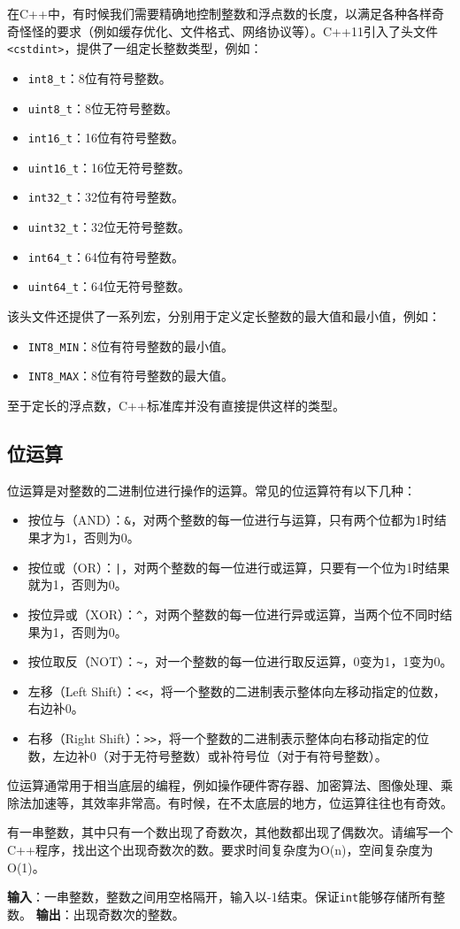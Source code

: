 \documentclass[../main.tex]{subfiles}
\begin{document}
在C++中，有时候我们需要精确地控制整数和浮点数的长度，以满足各种各样奇奇怪怪的要求（例如缓存优化、文件格式、网络协议等）。C++11引入了头文件\texttt{<cstdint>}，提供了一组定长整数类型，例如：
\begin{itemize}
  \item \texttt{int8\_t}：8位有符号整数。
  \item \texttt{uint8\_t}：8位无符号整数。
  \item \texttt{int16\_t}：16位有符号整数。
  \item \texttt{uint16\_t}：16位无符号整数。
  \item \texttt{int32\_t}：32位有符号整数。
  \item \texttt{uint32\_t}：32位无符号整数。
  \item \texttt{int64\_t}：64位有符号整数。
  \item \texttt{uint64\_t}：64位无符号整数。
\end{itemize}
该头文件还提供了一系列宏，分别用于定义定长整数的最大值和最小值，例如：
\begin{itemize}
  \item \texttt{INT8\_MIN}：8位有符号整数的最小值。
  \item \texttt{INT8\_MAX}：8位有符号整数的最大值。
\end{itemize}

至于定长的浮点数，C++标准库并没有直接提供这样的类型。

\subsection{位运算}

位运算是对整数的二进制位进行操作的运算。常见的位运算符有以下几种：
\begin{itemize}
    \item 按位与（AND）：\texttt{\&}，对两个整数的每一位进行与运算，只有两个位都为1时结果才为1，否则为0。
    \item 按位或（OR）：\texttt{|}，对两个整数的每一位进行或运算，只要有一个位为1时结果就为1，否则为0。
    \item 按位异或（XOR）：\texttt{\^}，对两个整数的每一位进行异或运算，当两个位不同时结果为1，否则为0。
    \item 按位取反（NOT）：\texttt{\~}，对一个整数的每一位进行取反运算，0变为1，1变为0。
    \item 左移（Left Shift）：\texttt{<<}，将一个整数的二进制表示整体向左移动指定的位数，右边补0。
    \item 右移（Right Shift）：\texttt{>>}，将一个整数的二进制表示整体向右移动指定的位数，左边补0（对于无符号整数）或补符号位（对于有符号整数）。
\end{itemize}
位运算通常用于相当底层的编程，例如操作硬件寄存器、加密算法、图像处理、乘除法加速等，其效率非常高。有时候，在不太底层的地方，位运算往往也有奇效。
\begin{example}
    有一串整数，其中只有一个数出现了奇数次，其他数都出现了偶数次。请编写一个C++程序，找出这个出现奇数次的数。要求时间复杂度为O(n)，空间复杂度为O(1)。

    \textbf{输入}：一串整数，整数之间用空格隔开，输入以-1结束。保证\texttt{int}能够存储所有整数。
    \textbf{输出}：出现奇数次的整数。
\end{example}
\end{document}
